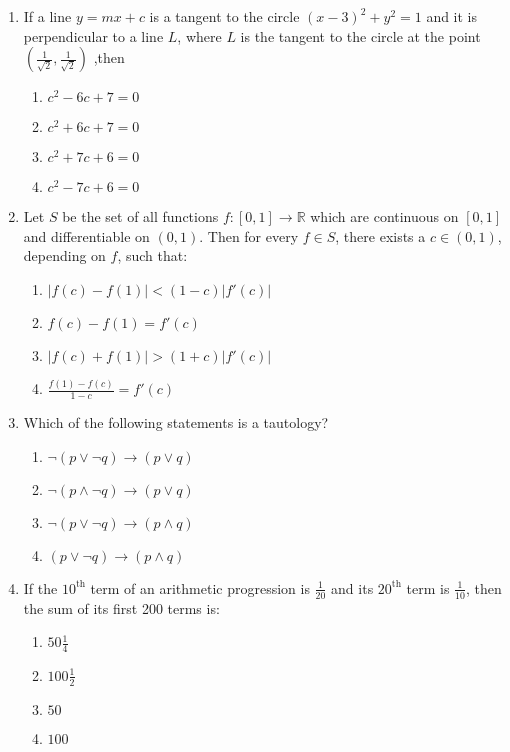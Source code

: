 \documentclass{article}
\begin{document}
\begin{enumerate}
\item If a line $y = mx + c$ is a tangent to the circle $(x - 3)^2 + y^2 = 1$ and it is perpendicular to a line $L$, where $L$ is the tangent to the circle at the point $( \frac{1}{\sqrt{2}} ,\frac {1}{\sqrt{2}}
)$ ,then

\begin{enumerate}
    \item $c^2 - 6c + 7 = 0$
    \item $c^2 + 6c + 7 = 0$
    \item $c^2 + 7c + 6 = 0$
    \item $c^2 - 7c + 6 = 0$
\end{enumerate}

\item Let $S$ be the set of all functions $f: [0, 1] \to \mathbb{R}$ which are continuous on $[0, 1]$ and differentiable on $(0, 1)$. Then for every $f \in S$, there exists a $c \in (0, 1)$, depending on $f$, such that:

\begin{enumerate}
    \item $|f(c)-f(1)| <(1 - c)|f'(c)|$
    \item $f(c) - f(1) = f'(c)$
    \item $|f(c) + f(1)| > (1 + c)|f'(c)|$
    \item $\frac{f(1) - f(c)}{1 - c} = f'(c)$
\end{enumerate}

\item Which of the following statements is a tautology?

\begin{enumerate}
    \item $\neg ( p \vee \neg q) \rightarrow (p \vee q)$
    \item $\neg ( p \wedge \neg q) \rightarrow (p \vee q)$
    \item $\neg (p \vee \neg q) \rightarrow (p \wedge q)$
    \item $(p \vee \neg q) \rightarrow (p \wedge q)$
\end{enumerate}

\item If the $10^{\text{th}}$ term of an arithmetic progression is $\frac{1}{20}$ and its $20^{\text{th}}$ term is $\frac{1}{10}$, then the sum of its first 200 terms is:

\begin{enumerate}
    \item $50 \frac{1}{4}$
    \item $100 \frac{1}{2}$
    \item $50$
    \item $100$
\end{enumerate}


\end{enumerate}
\end{document}
